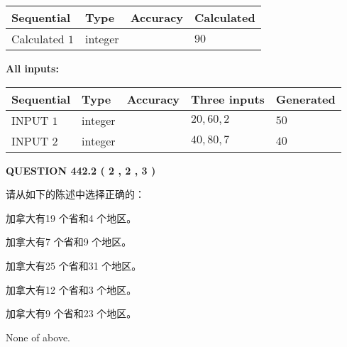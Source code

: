 \documentclass{ctexart}
\begin{document}
   
   
   
\noindent{}
   
   
  
  
\noindent\begin{tabular}{|l|l|l|l|}
\hline
 Sequential & Type & Accuracy & Calculated \\ 
\hline
 
 
  Calculated $  1 $ & integer &  & 
  $ 90 $ 
 \\  \hline  
 \end{tabular}
   
   
   
   
\noindent\vspace{0.1in}\hspace{-0.08in} {\textbf{\Large{All inputs: }}}
   
   
  
  
\noindent\begin{tabular}{|l|l|l|l|l|}
\hline
 Sequential & Type & Accuracy & Three inputs & Generated \\ 
\hline
 
 
  INPUT $  1 $ & integer &  & $
 20
 , 
 60
 , 
 2
 $ & $ 50 $ 
 \\  \hline  
 
 
  INPUT $  2 $ & integer &  & $
 40
 , 
 80
 , 
 7
 $ & $ 40 $ 
 \\  \hline  
 \end{tabular}
   
   
  
\vspace{0.2in}
  
{\textbf{\Large{QUESTION
442.2 
 ( 2 , 2 , 3 )
}}}
  
  
请从如下的陈述中选择正确的：
 
 
加拿大有19 个省和4 个地区。
 
 
加拿大有7 个省和9 个地区。
 
 
加拿大有25 个省和31 个地区。
 
 
加拿大有12 个省和3 个地区。
 
 
加拿大有9 个省和23 个地区。
 
 
 None of above.
 
 
\noindent{}
 
\end{document}
